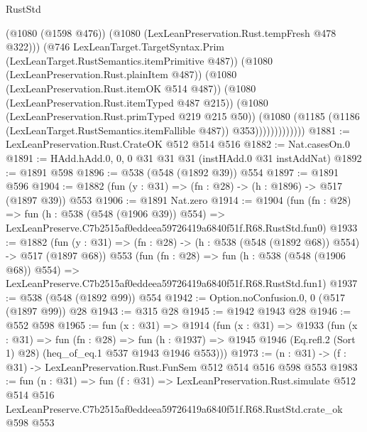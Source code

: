 \begin{lexlean}{RustStd}
\begin{coremodule}
                            (@1080 (@1598 @476))
                            (@1080 (LexLeanPreservation.Rust.tempFresh @478 @322)))
                          (@746
                            LexLeanTarget.TargetSyntax.Prim
                            (LexLeanTarget.RustSemantics.itemPrimitive @487))
                          (@1080 (LexLeanPreservation.Rust.plainItem @487))
                          (@1080 (LexLeanPreservation.Rust.itemOK @514 @487))
                          (@1080 (LexLeanPreservation.Rust.itemTyped @487 @215))
                          (@1080 (LexLeanPreservation.Rust.primTyped @219 @215 @50))
                          (@1080
                            (@1185
                              (@1186 (LexLeanTarget.RustSemantics.itemFallible @487))
                              @353)))))))))))))
@1881 := LexLeanPreservation.Rust.CrateOK @512 @514 @516
@1882 := Nat.casesOn.{0}
@1891 := HAdd.hAdd.{0, 0, 0} @31 @31 @31 (instHAdd.{0} @31 instAddNat)
@1892 := @1891 @598
@1896 := @538 (@548 (@1892 @39)) @554
@1897 := @1891 @596
@1904 := @1882 (fun (y : @31) => (fn : @28) -> (h : @1896) -> @517 (@1897 @39)) @553
@1906 := @1891 Nat.zero
@1914 := @1904
    (fun (fn : @28) =>
    fun (h : @538 (@548 (@1906 @39)) @554) =>
    LexLeanPreserve.C7b2515af0eddeea59726419a6840f51f.R68.RustStd.fun0)
@1933 := @1882
    (fun (y : @31) => (fn : @28) -> (h : @538 (@548 (@1892 @68)) @554) -> @517 (@1897 @68))
    @553
    (fun (fn : @28) =>
    fun (h : @538 (@548 (@1906 @68)) @554) =>
    LexLeanPreserve.C7b2515af0eddeea59726419a6840f51f.R68.RustStd.fun1)
@1937 := @538 (@548 (@1892 @99)) @554
@1942 := Option.noConfusion.{0, 0} (@517 (@1897 @99)) @28
@1943 := @315 @28
@1945 := @1942 @1943 @28
@1946 := @552 @598
@1965 := fun (x : @31) =>
  @1914
    (fun (x : @31) =>
    @1933
      (fun (x : @31) =>
      fun (fn : @28) =>
      fun (h : @1937) =>
      @1945 @1946 (Eq.refl.{2} (Sort 1) @28) (heq_of_eq.{1} @537 @1943 @1946 @553)))
@1973 := (n : @31) -> (f : @31) -> LexLeanPreservation.Rust.FunSem @512 @514 @516 @598 @553
@1983 := fun (n : @31) =>
  fun (f : @31) =>
  LexLeanPreservation.Rust.simulate
    @512
    @514
    @516
    LexLeanPreserve.C7b2515af0eddeea59726419a6840f51f.R68.RustStd.crate_ok
    @598
    @553
\end{coremodule}
\end{lexlean}
